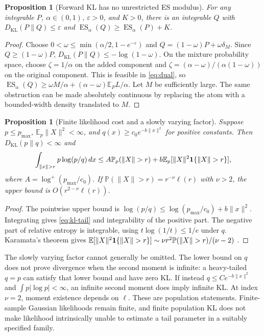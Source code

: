 \documentclass[11pt]{article}
\newtheorem{proposition}[theorem]{Proposition}
\theoremstyle{definition}\newtheorem{definition}[theorem]{Definition}
\theoremstyle{remark}\newtheorem{remark}[theorem]{Remark}
\newcommand{\E}{\mathbb E}\newcommand{\Prob}{\mathbb P}\newcommand{\R}{\mathbb R}
\newcommand{\KL}{D_{\mathrm{KL}}}\newcommand{\ES}{\operatorname{ES}}\newcommand{\VaR}{\operatorname{VaR}}
\begin{document}
\begin{proposition}[Forward KL has no unrestricted ES modulus]\label{prop:kl}
For any integrable $P$, $\alpha\in(0,1)$, $\varepsilon>0$, and $K>0$, there is an integrable $Q$ with $\KL(P\|Q)\le\varepsilon$ and $\ES_\alpha(Q)\ge\ES_\alpha(P)+K$.
\end{proposition}
\begin{proof}
Choose $0<\omega\le\min(\alpha/2,1-e^{-\varepsilon})$ and $Q=(1-\omega)P+\omega\delta_M$. Since $Q\ge(1-\omega)P$, $\KL(P\|Q)\le-\log(1-\omega)$. On the mixture probability space, choose $\zeta=1/\alpha$ on the added component and $\zeta=(\alpha-\omega)/(\alpha(1-\omega))$ on the original component. This is feasible in \eqref{eq:dual}, so
$\ES_\alpha(Q)\ge\omega M/\alpha+(\alpha-\omega)\E_P L/\alpha$.
Let $M$ be sufficiently large. The same obstruction can be made absolutely continuous by replacing the atom with a bounded-width density translated to $M$.
\end{proof}

\begin{proposition}[Finite likelihood cost and a slowly varying factor]\label{prop:finite-kl}
Suppose $p\le p_{\max}$, $\E_p\|X\|^2<\infty$, and $q(x)\ge c_0e^{-b\|x\|^2}$ for positive constants. Then $\KL(p\|q)<\infty$ and
\begin{equation}\label{eq:kl-tail}
\int_{\|x\|>r}p\log(p/q)\,dx
\le A\Prob_p(\|X\|>r)+b\E_p[\|X\|^2\ind\{\|X\|>r\}],
\end{equation}
where $A=\log^+(p_{\max}/c_0)$. If $\Prob(\|X\|>r)=r^{-\nu}\ell(r)$ with $\nu>2$, the upper bound is $O(r^{2-\nu}\ell(r))$.
\end{proposition}
\begin{proof}
The pointwise upper bound is $\log(p/q)\le\log(p_{\max}/c_0)+b\|x\|^2$. Integrating gives \eqref{eq:kl-tail} and integrability of the positive part. The negative part of relative entropy is integrable, using $t\log(1/t)\le1/e$ under $q$. Karamata's theorem gives
$\E[\|X\|^2\ind\{\|X\|>r\}]\sim\nu r^2\Prob(\|X\|>r)/(\nu-2)$ \citep{embrechts1997}.
\end{proof}
The slowly varying factor cannot generally be omitted. The lower bound on $q$ does not prove divergence when the second moment is infinite: a heavy-tailed $q=p$ can satisfy that lower bound and have zero KL. If instead $q\le Ce^{-b\|x\|^2}$ and $\int p|\log p|<\infty$, an infinite second moment does imply infinite KL. At index $\nu=2$, moment existence depends on $\ell$. These are population statements. Finite-sample Gaussian likelihoods remain finite, and finite population KL does not make likelihood intrinsically unable to estimate a tail parameter in a suitably specified family.
\end{document}
